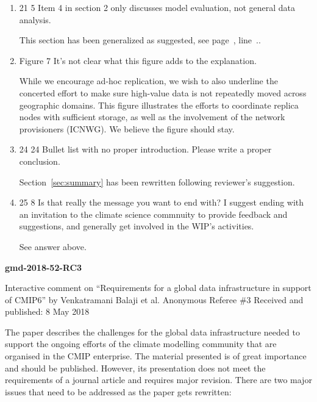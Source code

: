 \documentclass[gmd,manuscript]{copernicus}
\newcommand{\plref}[1]{see page~\pageref{p-#1}, line~\lineref{l-#1}.}
\newenvironment{answer}{\color{blue}}{}
\begin{document}
\begin{enumerate}[label=RC2-\arabic*,leftmargin=*]
  \begin{answer}
    \plref{RC2-32}
  \end{answer}
\item 21 5 Item 4 in section 2 only discusses model evaluation, not
  general data analysis.

  \begin{answer}
    This section has been generalized as suggested, \plref{SC1-1}.
  \end{answer}
\item Figure 7 It’s not clear what this figure adds
  to the explanation.

  \begin{answer}
    While we encourage ad-hoc replication, we wish to also underline
    the concerted effort to make sure high-value data is not
    repeatedly moved across geographic domains. This figure
    illustrates the efforts to coordinate replica nodes with
    sufficient storage, as well as the involvement of the network
    provisioners (ICNWG). We believe the figure should stay.
  \end{answer}
\item 24 24 Bullet list with no proper introduction. Please write a
  proper conclusion.

  \begin{answer}
    Section~\ref{sec:summary} has been rewritten following reviewer's
    suggestion.
  \end{answer}
\item 25 8 Is that really the message you want to end with? I suggest
  ending with an invitation to the climate science commnuity to
  provide feedback and suggestions, and generally get involved in the
  WIP’s activities.

  \begin{answer}
    See answer above.
  \end{answer}
\end{enumerate}

\pagebreak


\textbf{gmd-2018-52-RC3}

Interactive comment on “Requirements for a
global data infrastructure in support of CMIP6” by
Venkatramani Balaji et al.
Anonymous Referee \#3
Received and published: 8 May 2018

The paper describes the challenges for the global data infrastructure
needed to support the ongoing efforts of the climate modelling
community that are organised in the CMIP enterprise. The material
presented is of great importance and should be published. However, its
presentation does not meet the requirements of a journal article and
requires major revision. There are two major issues that need to be
addressed as the paper gets rewritten:
\end{document}
